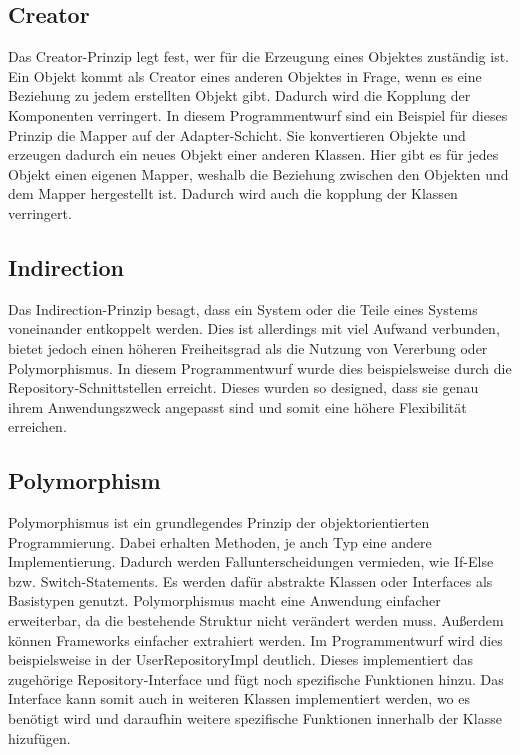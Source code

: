 \subsection{Creator}
Das Creator-Prinzip legt fest, wer für die Erzeugung eines Objektes zuständig ist. Ein Objekt kommt als Creator eines anderen Objektes in Frage, wenn es eine Beziehung zu jedem erstellten Objekt gibt. 
Dadurch wird die Kopplung der Komponenten verringert. 
\newline In diesem Programmentwurf sind ein Beispiel für dieses Prinzip die Mapper auf der Adapter-Schicht. Sie konvertieren Objekte und erzeugen dadurch ein neues Objekt einer anderen Klassen. Hier gibt es für jedes Objekt einen eigenen Mapper, 
weshalb die Beziehung zwischen den Objekten und dem Mapper hergestellt ist. Dadurch wird auch die kopplung der Klassen verringert.
\subsection{Indirection}
Das Indirection-Prinzip besagt, dass ein System oder die Teile eines Systems voneinander entkoppelt werden. Dies ist allerdings mit viel Aufwand verbunden, bietet jedoch einen höheren Freiheitsgrad als die Nutzung von Vererbung oder Polymorphismus.
\newline In diesem Programmentwurf wurde dies beispielsweise durch die Repository-Schnittstellen erreicht. Dieses wurden so designed, dass sie genau ihrem Anwendungszweck angepasst sind und somit eine höhere Flexibilität erreichen.
\subsection{Polymorphism}
Polymorphismus ist ein grundlegendes Prinzip der objektorientierten Programmierung. Dabei erhalten Methoden, je anch Typ eine andere Implementierung. Dadurch werden Fallunterscheidungen vermieden, wie If-Else bzw. Switch-Statements. 
Es werden dafür abstrakte Klassen oder Interfaces als Basistypen genutzt. Polymorphismus macht eine Anwendung einfacher erweiterbar, da die bestehende Struktur nicht verändert werden muss. Außerdem können Frameworks einfacher extrahiert werden. 
\newline Im Programmentwurf wird dies beispielsweise in der \glqq UserRepositoryImpl \grqq deutlich. Dieses implementiert das zugehörige Repository-Interface und fügt noch spezifische Funktionen hinzu. Das Interface 
kann somit auch in weiteren Klassen implementiert werden, wo es benötigt wird und daraufhin weitere spezifische Funktionen innerhalb der Klasse hizufügen.
